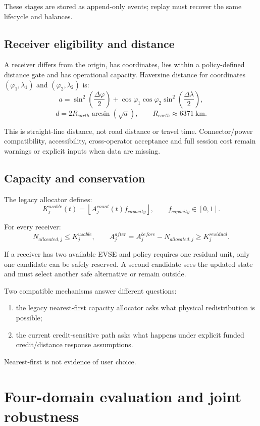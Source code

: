 \documentclass[11pt,a4paper]{article}
\begin{document}
These stages are stored as append-only events; replay must recover the same lifecycle and balances.

\subsection{Receiver eligibility and distance}

A receiver differs from the origin, has coordinates, lies within a policy-defined distance gate and has operational capacity. Haversine distance for coordinates $(\varphi_1,\lambda_1)$ and $(\varphi_2,\lambda_2)$ is:
\[
a=\sin^2\!\left(\frac{\Delta\varphi}{2}\right)
+\cos\varphi_1\cos\varphi_2
\sin^2\!\left(\frac{\Delta\lambda}{2}\right),
\]
\[
d=2R_{earth}\arcsin(\sqrt a),
\qquad R_{earth}\approx6371\ \text{km}.
\]

This is straight-line distance, not road distance or travel time. Connector/power compatibility, accessibility, cross-operator acceptance and full session cost remain warnings or explicit inputs when data are missing.

\subsection{Capacity and conservation}

The legacy allocator defines:
\[
K_j^{usable}(t)=\left\lfloor A_j^{count}(t)f_{capacity}\right\rfloor,
\qquad f_{capacity}\in[0,1].
\]

For every receiver:
\[
N_{allocated,j}\le K_j^{usable},
\qquad
A_j^{after}=A_j^{before}-N_{allocated,j}\ge K_j^{residual}.
\]

If a receiver has two available EVSE and policy requires one residual unit, only one candidate can be safely reserved. A second candidate sees the updated state and must select another safe alternative or remain outside.

Two compatible mechanisms answer different questions:
\begin{enumerate}
\item the legacy nearest-first capacity allocator asks what physical redistribution is possible;
\item the current credit-sensitive path asks what happens under explicit funded credit/distance response assumptions.
\end{enumerate}

Nearest-first is not evidence of user choice.

\section{Four-domain evaluation and joint robustness}
\end{document}

